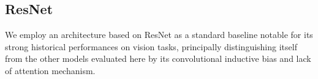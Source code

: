 
\subsection{ResNet} \label{sec:resnet_model_details_appendix}
We employ an architecture based on ResNet\citep{he2015deepresiduallearningimage} as a standard baseline notable for its strong historical performances on vision tasks, principally distinguishing itself from the other models evaluated here by its convolutional inductive bias and lack of attention mechanism.

